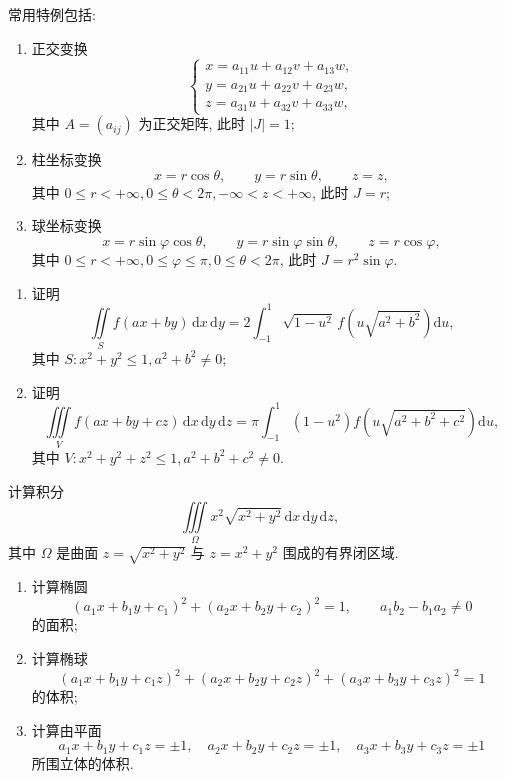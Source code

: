 \documentclass[../../数学分析培优讲义.tex]{subfiles}
\begin{document}
\begin{remark}
常用特例包括:
\begin{enumerate}[label=(\arabic*)]
    \item 正交变换
    \[
        \begin{cases}
            x=a_{11}u+a_{12}v+a_{13}w,\\
            y=a_{21}u+a_{22}v+a_{23}w,\\
            z=a_{31}u+a_{32}v+a_{33}w,
        \end{cases}
    \]
    其中 $A=(a_{ij})$ 为正交矩阵, 此时 $|J|=1$;
    \item 柱坐标变换
    \[
        x=r\cos\theta,\qquad y=r\sin\theta,\qquad z=z,
    \]
    其中 $0\leq r<+\infty,0\leq\theta<2\pi,-\infty<z<+\infty$, 此时 $J=r$;
    \item 球坐标变换
    \[
        x=r\sin\varphi\cos\theta,\qquad
        y=r\sin\varphi\sin\theta,\qquad
        z=r\cos\varphi,
    \]
    其中 $0\leq r<+\infty,0\leq\varphi\leq\pi,0\leq\theta<2\pi$, 此时 $J=r^2\sin\varphi$.
\end{enumerate}
\end{remark}

\begin{example}
\begin{enumerate}[label=(\arabic*)]
    \item 证明
    \[
        \iint\limits_S f(ax+by)\,\mathrm{d}x\,\mathrm{d}y
        =2\int_{-1}^1\sqrt{1-u^2}\,f\left(u\sqrt{a^2+b^2}\right)\mathrm{d}u,
    \]
    其中 $S:x^2+y^2\leq1,a^2+b^2\ne0$;
    \item 证明
    \[
        \iiint\limits_Vf(ax+by+cz)\,\mathrm{d}x\,\mathrm{d}y\,\mathrm{d}z
        =\pi\int_{-1}^1(1-u^2)f\left(u\sqrt{a^2+b^2+c^2}\right)\mathrm{d}u,
    \]
    其中 $V:x^2+y^2+z^2\leq1,a^2+b^2+c^2\ne0$.
\end{enumerate}
\end{example}
\exampleblank

\begin{example}
计算积分
\[
    \iiint\limits_\Omega x^2\sqrt{x^2+y^2}\,\mathrm{d}x\,\mathrm{d}y\,\mathrm{d}z,
\]
其中 $\Omega$ 是曲面 $z=\sqrt{x^2+y^2}$ 与 $z=x^2+y^2$ 围成的有界闭区域.
\end{example}
\exampleblank

\begin{example}
\begin{enumerate}[label=(\arabic*)]
    \item 计算椭圆
    \[
        (a_1x+b_1y+c_1)^2+(a_2x+b_2y+c_2)^2=1,
        \qquad a_1b_2-b_1a_2\ne0
    \]
    的面积;
    \item 计算椭球
    \[
        (a_1x+b_1y+c_1z)^2+(a_2x+b_2y+c_2z)^2+(a_3x+b_3y+c_3z)^2=1
    \]
    的体积;
    \item 计算由平面
    \[
        a_1x+b_1y+c_1z=\pm1,\quad
        a_2x+b_2y+c_2z=\pm1,\quad
        a_3x+b_3y+c_3z=\pm1
    \]
    所围立体的体积.
\end{enumerate}
\end{example}
\exampleblank
\end{document}
